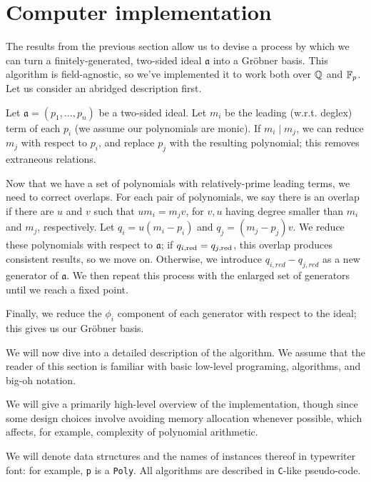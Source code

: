 \section{Computer implementation}
\label{sec:implementation}

The results from the previous section allow us to devise a process by which we can
turn a finitely-generated, two-sided ideal $\mathfrak{a}$ into a Gr\"obner basis. This
algorithm is field-agnostic, so we've implemented it to work both over $\mathbb{Q}$ and $\mathbb{F}_p$.
Let us consider an abridged description first.

\begin{alg}
    Let $\mathfrak{a} = (p_1,\ldots,p_n)$ be a two-sided ideal. Let $m_i$ be the 
    leading (w.r.t. deglex) term of each $p_i$ (we assume our polynomials are monic).
    If $m_i \mid m_j$, we can reduce $m_j$ with respect to $p_i$, and replace $p_j$
    with the resulting polynomial; this removes extraneous relations.
    
    Now that we have a set of polynomials with relatively-prime leading terms, we need
    to correct overlaps. For each pair of polynomials, we say there is an overlap 
    if there are $u$ and $v$ such that $um_i = m_j v$, for $v, u$ having degree smaller 
    than $m_i$ and $m_j$, respectively. Let $q_i = u(m_i - p_i)$ and $q_j = (m_j - p_j)v$.
    We reduce these polynomials with respect to $\mathfrak{a}$; if $q_{i,\mathrm{red}} = q_{j,\mathrm{red}}$,
    this overlap produces consistent results, so we move on. Otherwise, we introduce
    $q_{i,red} - q_{j,red}$ as a new generator of $\mathfrak{a}$. 
    We then repeat this process with the enlarged set of generators 
    until we reach a fixed point.
    
    Finally, we reduce the $\phi_i$ component of each generator with respect to the 
    ideal; this gives us our Gr\"obner basis.
\end{alg}

We will now dive into a detailed description of the algorithm. We assume that the
reader of this section is familiar with basic low-level programing, algorithms, and
big-oh notation.

\begin{rem}
    We will give a primarily high-level overview of the implementation, though since some
    design choices involve avoiding memory allocation whenever possible, which
    affects, for example, complexity of polynomial arithmetic. 
    
    We will denote data structures and the names of instances thereof in typewriter font:
    for example, \verb|p| is a \verb|Poly|. All algorithms are described in
    \verb|C|-like pseudo-code.
\end{rem}


